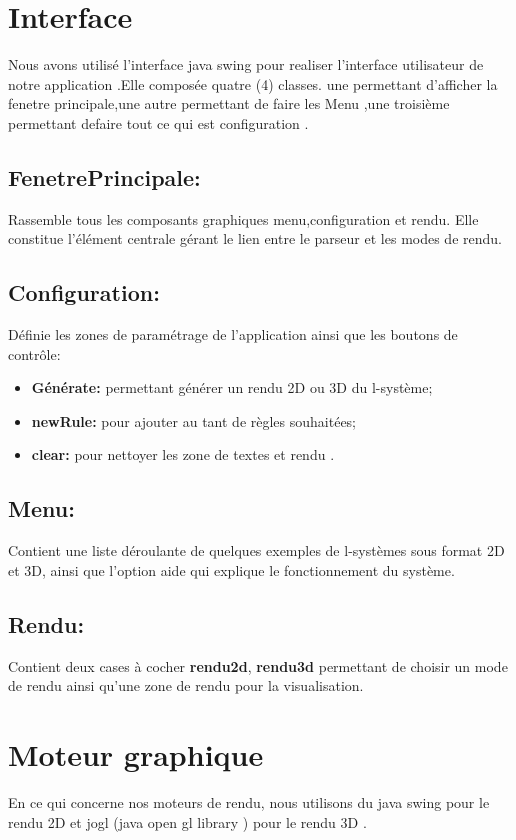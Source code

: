 \section{Interface}
Nous avons utilisé l'interface java swing pour realiser l'interface utilisateur de notre application .Elle composée quatre (4) classes.
une permettant d'afficher la fenetre principale,une autre permettant de faire les Menu ,une troisième permettant defaire tout ce qui est configuration .

\subsection{FenetrePrincipale:}	
	Rassemble  tous les composants graphiques  menu,configuration et rendu. Elle constitue l'élément centrale gérant le lien entre le parseur et les modes de rendu.
\subsection{Configuration:}	\label{config}
	Définie les zones de paramétrage de l'application ainsi que les boutons de contrôle:
	\begin{itemize}
		 \item \textbf{Générate:} permettant générer un rendu 2D ou 3D du l-système;
		 \item \textbf{newRule:} pour ajouter au tant de règles souhaitées;
		 \item \textbf{clear:}  pour nettoyer les zone de textes et rendu .
	\end{itemize}
\subsection{Menu:}	
	Contient une liste déroulante de quelques exemples de l-systèmes sous format 2D et 3D, ainsi que l'option aide qui explique le fonctionnement du système. 
\subsection{Rendu:}
 Contient deux cases à cocher \textbf{rendu2d}, \textbf{rendu3d} permettant de choisir un mode de rendu ainsi qu'une zone de rendu pour la visualisation.
\section{Moteur graphique}
En ce qui concerne nos moteurs de rendu, nous utilisons du java swing pour le rendu 2D et jogl (java open gl library ) pour le rendu 3D .
	
